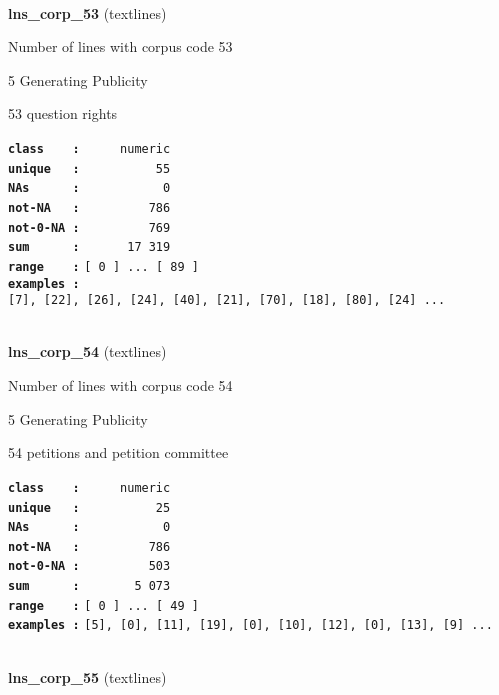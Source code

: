 \documentclass[]{article}
\begin{document}
~

\textbf{lns\_corp\_53} (textlines)

Number of lines with corpus code 53

5 Generating Publicity

53 question rights

\textbf{\texttt{class\ \ \ \ :}} \texttt{~~~~~numeric}\\
\textbf{\texttt{unique\ \ \ :}} \texttt{~~~~~~~~~~55}\\
\textbf{\texttt{NAs\ \ \ \ \ \ :}} \texttt{~~~~~~~~~~~0}\\
\textbf{\texttt{not-NA\ \ \ :}} \texttt{~~~~~~~~~786}\\
\textbf{\texttt{not-0-NA\ :}} \texttt{~~~~~~~~~769}\\
\textbf{\texttt{sum\ \ \ \ \ \ :}} \texttt{~~~~~~17~319}\\
\textbf{\texttt{range\ \ \ \ :}}
\texttt{{[}\ 0\ {]}\ ...\ {[}\ 89\ {]}}\\
\textbf{\texttt{examples\ :}}
\texttt{{[}7{]},\ {[}22{]},\ {[}26{]},\ {[}24{]},\ {[}40{]},\ {[}21{]},\ {[}70{]},\ {[}18{]},\ {[}80{]},\ {[}24{]}\ ...}\\

~

\textbf{lns\_corp\_54} (textlines)

Number of lines with corpus code 54

5 Generating Publicity

54 petitions and petition committee

\textbf{\texttt{class\ \ \ \ :}} \texttt{~~~~~numeric}\\
\textbf{\texttt{unique\ \ \ :}} \texttt{~~~~~~~~~~25}\\
\textbf{\texttt{NAs\ \ \ \ \ \ :}} \texttt{~~~~~~~~~~~0}\\
\textbf{\texttt{not-NA\ \ \ :}} \texttt{~~~~~~~~~786}\\
\textbf{\texttt{not-0-NA\ :}} \texttt{~~~~~~~~~503}\\
\textbf{\texttt{sum\ \ \ \ \ \ :}} \texttt{~~~~~~~5~073}\\
\textbf{\texttt{range\ \ \ \ :}}
\texttt{{[}\ 0\ {]}\ ...\ {[}\ 49\ {]}}\\
\textbf{\texttt{examples\ :}}
\texttt{{[}5{]},\ {[}0{]},\ {[}11{]},\ {[}19{]},\ {[}0{]},\ {[}10{]},\ {[}12{]},\ {[}0{]},\ {[}13{]},\ {[}9{]}\ ...}\\

~

\textbf{lns\_corp\_55} (textlines)
\end{document}
